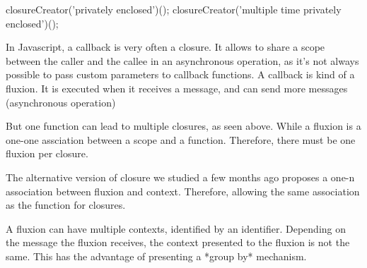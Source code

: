 \begin{code}
closureCreator('privately enclosed')();
closureCreator('multiple time privately enclosed')();
\end{code}

In Javascript, a callback is very often a closure.
It allows to share a scope between the caller and the callee in an asynchronous operation, as it's not always possible to pass custom parameters to callback functions.
A callback is kind of a fluxion.
It is executed when it receives a message, and can send more messages (asynchronous operation)

But one function can lead to multiple closures, as seen above.
While a fluxion is a one-one assciation between a scope and a function.
Therefore, there must be one fluxion per closure.



The alternative version of closure we studied a few months ago proposes a one-n association between fluxion and context.
Therefore, allowing the same association as the function for closures.

A fluxion can have multiple contexts, identified by an identifier.
Depending on the message the fluxion receives, the context presented to the fluxion is not the same.
This has the advantage of presenting a *group by* mechanism.





